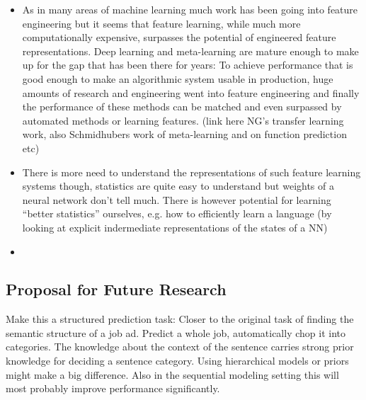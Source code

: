 \begin{itemize}
  \item As in many areas of machine learning much work has been going into feature engineering but it seems that feature learning, while much more computationally expensive, surpasses the potential of engineered feature representations. Deep learning and meta-learning are mature enough to make up for the gap that has been there for years: To achieve performance that is good enough to make an algorithmic system usable in production, huge amounts of research and engineering went into feature engineering and finally the performance of these methods can be matched and even surpassed by automated methods or learning features. (link here NG's transfer learning work, also Schmidhubers work of meta-learning and on function prediction etc)
  \item There is more need to understand the representations of such feature learning systems though, statistics are quite easy to understand but weights of a neural network don't tell much. There is however potential for learning ``better statistics'' ourselves, e.g. how to efficiently learn a language (by looking at explicit indermediate representations of the states of a NN)
  \item
\end{itemize}


%

\subsection*{Proposal for Future Research}
\label{sub:further-research}

Make this a structured prediction task: Closer to the original task of finding the semantic structure of a job ad. Predict a whole job, automatically chop it into categories. The knowledge about the context of the sentence carries strong prior knowledge for deciding a sentence category. Using hierarchical models or priors might make a big difference. Also in the sequential modeling setting this will most probably improve performance significantly.

